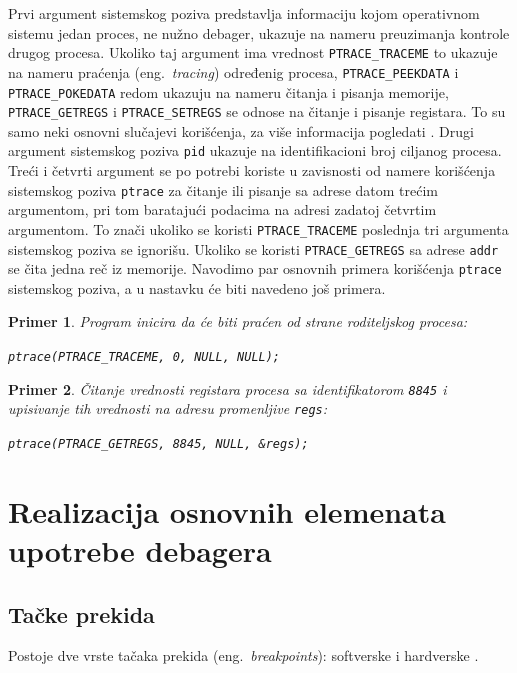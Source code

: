 \documentclass[12pt,oneside]{memoir}
\newtheorem{primer}{Primer}
\begin{document}
Prvi argument sistemskog poziva predstavlja informaciju kojom operativnom sistemu jedan proces, ne nužno debager, ukazuje na nameru preuzimanja kontrole drugog procesa. Ukoliko taj argument ima vrednost \texttt{PTRACE\_TRACEME} to ukazuje na nameru praćenja (eng.~\emph{tracing}) određenig procesa, \texttt{PTRACE\_PEEKDATA} i \texttt{PTRACE\_POKEDATA} redom ukazuju na nameru čitanja i pisanja  memorije, \texttt{PTRACE\_GETREGS} i \texttt{PTRACE\_SETREGS} se odnose na čitanje i pisanje registara. To su samo neki osnovni slučajevi korišćenja, za više informacija pogledati \cite{ptrace}. Drugi argument sistemskog poziva \texttt{pid} ukazuje na identifikacioni broj ciljanog procesa. Treći i četvrti argument se po potrebi koriste u zavisnosti od namere korišćenja sistemskog poziva \texttt{ptrace} za čitanje ili pisanje sa adrese datom trećim argumentom, pri tom baratajući podacima na adresi zadatoj četvrtim argumentom. To znači ukoliko se koristi \texttt{PTRACE\_TRACEME} poslednja tri argumenta sistemskog poziva se ignorišu. Ukoliko se koristi \texttt{PTRACE\_GETREGS} sa adrese \texttt{addr} se čita jedna reč iz memorije. Navodimo par osnovnih primera korišćenja \texttt{ptrace} sistemskog poziva, a u nastavku će biti navedeno još primera.

\begin{primer}
Program inicira da će biti praćen od strane roditeljskog procesa:

\texttt{ptrace(PTRACE\_TRACEME, 0, NULL, NULL);}
\end{primer}

\begin{primer}
Čitanje vrednosti registara procesa sa identifikatorom \texttt{8845} i upisivanje tih vrednosti na adresu promenljive \texttt{regs}:

\texttt{ptrace(PTRACE\_GETREGS, 8845, NULL, \&regs);}

\end{primer}

\section{Realizacija osnovnih elemenata upotrebe debagera}

\subsection{Tačke prekida}

Postoje dve vrste tačaka prekida (eng.~\emph{breakpoints}): softverske i hardverske \cite{GDB}.
\end{document}

